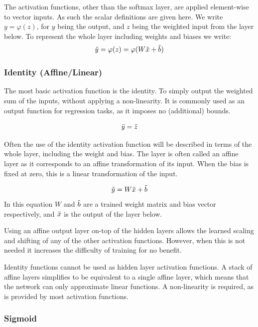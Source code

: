 \documentclass[12pt,parskip]{komatufte}
\begin{document}
The activation functions, other than the softmax layer, are applied element-wise to vector inputs.
As such the scalar definitions are given here.
We write $y = \varphi(z)$, for $y$ being the output, and $z$ being the weighted input from the layer below.
To represent the whole layer including weights and biases we write:
\begin{equation}
\tilde{y} =\varphi(z) = \varphi(W \tilde{x} + \tilde{b})
\end{equation}

\subsubsection{Identity (Affine/Linear)}
The most basic activation function is the identity.
To simply output the weighted sum of the inputs, without applying a non-linearity.
It is commonly used as an output function for regression tasks,
as it imposes no (additional) bounds.

\begin{equation}
\tilde{y}= \tilde{z}
\end{equation}

Often the use of the identity activation function will be described in terms of the whole layer, including the weight and bias.
The layer is often called an affine layer as it corresponds to an affine transformation of its input.
When the bias is fixed at zero, this is a linear transformation of the input.

\begin{equation}
\tilde{y}=W \tilde{x} + \tilde{b}
\end{equation}
In this equation $W$ and $\tilde{b}$ are a trained weight matrix and bias vector respectively,
and $\tilde{x}$ is the output of the layer below.

Using an affine output layer on-top of the hidden layers
allows the learned scaling and shifting of any of the other activation functions.
However, when this is not needed it increases the difficulty of training for no benefit.

Identity functions cannot be used as hidden layer activation functions.
A stack of affine layers simplifies to be equivalent to a single affine layer, which means that the network can only approximate linear functions.
A non-linearity is required, as is provided by most activation functions.


\subsubsection{Sigmoid}
\end{document}
